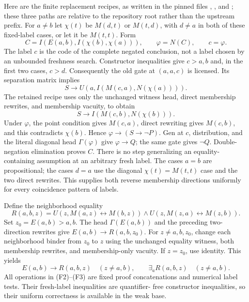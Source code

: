 Here are the finite replacement recipes, as written in the pinned
files ,
, and
; these three paths are
relative to the repository root rather than the upstream prefix.
For $a\ne b$ let $\chi(t)$ be $M(d,t)$ or $M(t,d)$, with
$d\ne a$ in both of these fixed-label cases, or let it be $M(t,t)$.
Form
\[
 C=I(E(a,b),I(\chi(b),\chi(a))),\qquad \varphi=N(C),
 \qquad c=\varphi.
 \tag{F2}
\]
The label $c$ is the code of the complete negated conclusion, not a
label chosen by an unbounded freshness search.  Constructor
inequalities give $c>a,b$ and, in the first two cases, $c>d$.
Consequently the old gate at $(a,a,c)$ is licensed.  Its separation
matrix implies
\[
 S\longrightarrow U(a,I(M(c,a),N(\chi(a)))).
\]
The retained  recipe uses only the
unchanged witness head, direct membership rewrites, and membership
vacuity, to obtain
\[
 S\longrightarrow I(M(c,b),N(\chi(b))).
\]
Under $\varphi$, the point condition gives $M(c,a)$, direct rewriting
gives $M(c,b)$, and this contradicts $\chi(b)$.  Hence
$\varphi\to(S\to\neg P)$.  Gen at $c$, distribution, and the
literal diagonal head $\Gamma(\varphi)$ give $\varphi\to Q$;
the same gate gives $\neg Q$.  Double-negation elimination proves
$C$.  There is no step generalizing an equality-containing assumption
at an arbitrary fresh label.  The cases $a=b$ are propositional; the
cases $d=a$ use the diagonal $\chi(t)=M(t,t)$ case and the two direct
rewrites.  This supplies both reverse membership directions uniformly
for every coincidence pattern of labels.

Define the neighborhood equality
\[
 R(a,b,z)=U(z,M(a,z)\leftrightarrow M(b,z))
          \wedge U(z,M(z,a)\leftrightarrow M(z,b)).
\]
Set $z_0=E(a,b)>a,b$.  The head $\Gamma(E(a,b))$ and the preceding
two-direction rewrites give $E(a,b)\to R(a,b,z_0)$.  For
$z\ne a,b,z_0$, change each neighborhood binder from $z_0$ to $z$
using the unchanged equality witness, both membership rewrites, and
membership-only vacuity.  If $z=z_0$, use identity.  This yields
\[
 E(a,b)\to R(a,b,z)\quad(z\ne a,b),\qquad
 \exists_a R(a,b,z)\quad(z\ne a,b).
 \tag{F3}
\]
All operations in (F2)--(F3) are fixed proof concatenations and
numerical label tests.  Their fresh-label inequalities are quantifier-
free constructor inequalities, so their uniform correctness is
available in the weak base.

